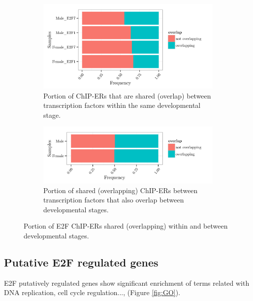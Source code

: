 \documentclass[11pt,twoside,a4paper]{report}
\begin{document}
		\begin{figure}[here]
			\setlength{\belowcaptionskip}{5pt}
			\centering
			\begin{subfigure}[b]{0.75\textwidth}
				\includegraphics[width=1\linewidth]{pngs/E2F_overlap.png}
				\caption{Portion of ChIP-ERs that are shared (overlap) between transcription factors within the same developmental stage.}
			\end{subfigure}
			\begin{subfigure}[b]{0.75\textwidth}
				\includegraphics[width=1\linewidth]{pngs/E2F_overlap_overlaps.png}
				\caption{Portion of shared (overlapping) ChIP-ERs between transcription factors that also overlap between developmental stages.}
			\end{subfigure}
			\caption{Portion of E2F ChIP-ERs shared (overlapping) within and between developmental stages.}
			\label{fig:E2F_colocalization}
		\end{figure}
		
	\subsection{Putative E2F regulated genes}
		
    	E2F putatively regulated genes show significant enrichment of terms related with DNA replication, cell cycle regulation...,  (Figure \ref{fig:GO}).
		    	
\end{document}
